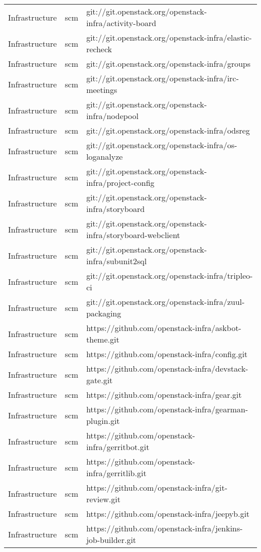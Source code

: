 \begin{center}
\begin{longtable}{|p{4cm}|p{1cm}|p{10cm}|}
Infrastructure&scm&git://git.openstack.org/openstack-infra/activity-board\\ 
Infrastructure&scm&git://git.openstack.org/openstack-infra/elastic-recheck\\ 
Infrastructure&scm&git://git.openstack.org/openstack-infra/groups\\ 
Infrastructure&scm&git://git.openstack.org/openstack-infra/irc-meetings\\ 
Infrastructure&scm&git://git.openstack.org/openstack-infra/nodepool\\ 
Infrastructure&scm&git://git.openstack.org/openstack-infra/odsreg\\ 
Infrastructure&scm&git://git.openstack.org/openstack-infra/os-loganalyze\\ 
Infrastructure&scm&git://git.openstack.org/openstack-infra/project-config\\ 
Infrastructure&scm&git://git.openstack.org/openstack-infra/storyboard\\ 
Infrastructure&scm&git://git.openstack.org/openstack-infra/storyboard-webclient\\ 
Infrastructure&scm&git://git.openstack.org/openstack-infra/subunit2sql\\ 
Infrastructure&scm&git://git.openstack.org/openstack-infra/tripleo-ci\\ 
Infrastructure&scm&git://git.openstack.org/openstack-infra/zuul-packaging\\ 
Infrastructure&scm&https://github.com/openstack-infra/askbot-theme.git\\ 
Infrastructure&scm&https://github.com/openstack-infra/config.git\\ 
Infrastructure&scm&https://github.com/openstack-infra/devstack-gate.git\\ 
Infrastructure&scm&https://github.com/openstack-infra/gear.git\\ 
Infrastructure&scm&https://github.com/openstack-infra/gearman-plugin.git\\ 
Infrastructure&scm&https://github.com/openstack-infra/gerritbot.git\\ 
Infrastructure&scm&https://github.com/openstack-infra/gerritlib.git\\ 
Infrastructure&scm&https://github.com/openstack-infra/git-review.git\\ 
Infrastructure&scm&https://github.com/openstack-infra/jeepyb.git\\ 
Infrastructure&scm&https://github.com/openstack-infra/jenkins-job-builder.git\\ 

\end{longtable}
\end{center}

